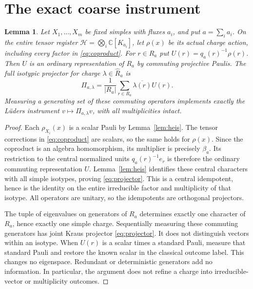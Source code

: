 \documentclass[11pt]{amsart}
\newtheorem{lemma}[theorem]{Lemma}
\theoremstyle{definition}\newtheorem{definition}[theorem]{Definition}
\newcommand{\C}{\mathbb C}
\begin{document}
\section{The exact coarse instrument}
\begin{lemma}\label{lem:projector}
Let $X_1,\ldots,X_m$ be fixed simples with fluxes $a_i$, and put
$a=\sum_i a_i$. On the entire tensor register
$\mathcal H=\bigotimes_i\C[K_{a_i}]$, let $\rho(x)$ be its actual charge action,
including every factor in \eqref{eq:coproduct}. For $r\in R_a$ put
$U(r)=q_a(r)^{-1}\rho(r)$. Then $U$ is an ordinary representation of $R_a$
by commuting projective Paulis. The full isotypic projector for charge
$\lambda\in\widehat R_a$ is
\begin{equation}\label{eq:projector}
 \Pi_{a,\lambda}=\frac1{|R_a|}\sum_{r\in R_a}\overline{\lambda(r)}U(r).
\end{equation}
Measuring a generating set of these commuting operators implements exactly
the L\"uders instrument $v\mapsto\Pi_{a,\lambda}v$, with all multiplicities intact.
\end{lemma}
\begin{proof}
Each $\rho_{X_i}(x)$ is a scalar Pauli by Lemma~\ref{lem:heis}. The tensor
corrections in \eqref{eq:coproduct} are scalars, so the same holds for $\rho(x)$.
Since the coproduct is an algebra homomorphism, its multiplier is precisely
$\beta_a$. Its restriction to the central normalized units
$q_a(r)^{-1}e_r$ is therefore the ordinary commuting representation $U$.
Lemma~\ref{lem:heis} identifies these central characters with all simple
isotypes, proving \eqref{eq:projector}. This is a central idempotent, hence is
the identity on the entire irreducible factor and multiplicity of that isotype.
All operators are unitary, so the idempotents are orthogonal projectors.

The tuple of eigenvalues on generators of $R_a$ determines exactly one
character of $R_a$, hence exactly one simple charge. Sequentially measuring
these commuting generators has joint Kraus projector \eqref{eq:projector}.
It does not distinguish vectors within an isotype. When $U(r)$ is a scalar
times a standard Pauli, measure that standard Pauli and restore the known
scalar in the classical outcome label. This changes no eigenspace. Redundant
or deterministic generators add no information. In particular, the argument
does not refine a charge into irreducible-vector or multiplicity outcomes.
\end{proof}
\end{document}
